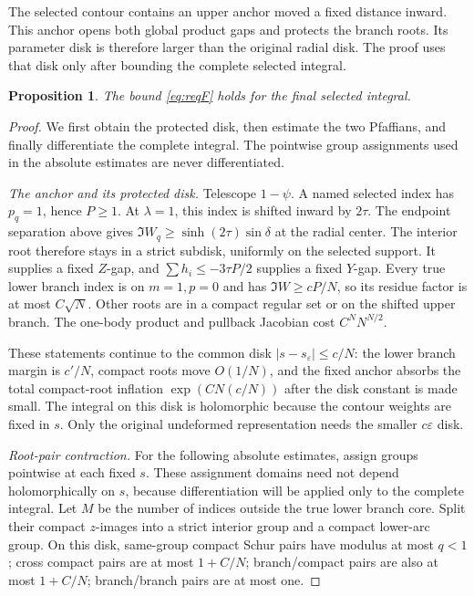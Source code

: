 \documentclass[11pt]{article}
\numberwithin{equation}{section}
\newtheorem{proposition}[theorem]{Proposition}
\theoremstyle{definition}
\newcommand{\eps}{\varepsilon}
\newcommand{\se}{s_\varepsilon}
\begin{document}
The selected contour contains an upper anchor moved a fixed distance
inward. This anchor opens both global product gaps and protects the
branch roots. Its parameter disk is therefore larger than the original
radial disk. The proof uses that disk only after bounding the complete
selected integral.
\begin{proposition}\label{prop:F}
The bound \eqref{eq:reqF} holds for the final selected integral.
\end{proposition}
\begin{proof}
We first obtain the protected disk, then estimate the two Pfaffians, and finally differentiate the complete integral. The pointwise group assignments used in the absolute estimates are never differentiated.

\smallskip\noindent\textit{The anchor and its protected disk.}
Telescope \(1-\psi\). A named selected index has \(p_q=1\), hence \(P\ge1\).
At \(\lambda=1\), this index is shifted inward by \(2\tau\).
The endpoint separation above gives
\(\Im W_q\ge\sinh(2\tau)\sin\delta\) at the radial center.
The interior root therefore stays in a strict subdisk, uniformly
on the selected support. It supplies a fixed \(Z\)-gap, and
\(\sum h_i\le-3\tau P/2\) supplies a fixed \(Y\)-gap.
Every true lower branch index is on \(m=1,p=0\) and has
\(\Im W\ge cP/N\), so its residue factor is at most \(C\sqrt N\).
Other roots are in a compact regular set or on the shifted upper
branch. The one-body product and pullback Jacobian cost
\(C^N N^{N/2}\).

These statements continue to the common disk \(|s-\se|\le c/N\):
the lower branch margin is \(c'/N\), compact roots move \(O(1/N)\),
and the fixed anchor absorbs the total compact-root inflation
\(\exp(CN(c/N))\) after the disk constant is made small.
The integral on this disk is holomorphic because the contour weights
are fixed in \(s\). Only the original undeformed representation needs
the smaller \(c\eps\) disk.

\smallskip\noindent\textit{Root-pair contraction.}
For the following absolute estimates, assign groups pointwise at each
fixed \(s\). These assignment domains need not depend holomorphically
on \(s\), because differentiation will be applied only to the complete integral.
Let \(M\) be the number of indices outside the true lower branch core.
Split their compact \(z\)-images into a strict interior group and a
compact lower-arc group. On this disk, same-group compact Schur
pairs have modulus at most \(q<1\); cross compact pairs are at most
\(1+C/N\); branch/compact pairs are also at most \(1+C/N\);
branch/branch pairs are at most one.


\end{proof}
\end{document}
